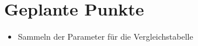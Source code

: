 \section{Geplante Punkte}


\begin{itemize}
  \item Sammeln der Parameter für die Vergleichstabelle
\end{itemize}

